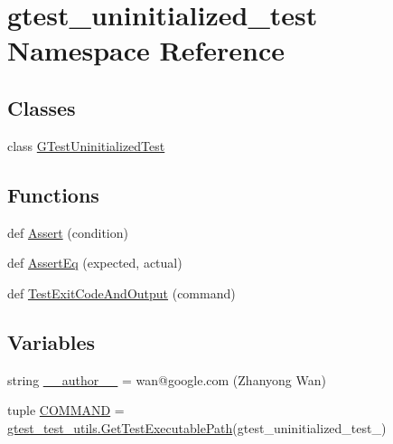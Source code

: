 \hypertarget{namespacegtest__uninitialized__test}{}\section{gtest\+\_\+uninitialized\+\_\+test Namespace Reference}
\label{namespacegtest__uninitialized__test}
\subsection*{Classes}
\begin{DoxyCompactItemize}
\item 
class \hyperlink{classgtest__uninitialized__test_1_1_g_test_uninitialized_test}{G\+Test\+Uninitialized\+Test}
\end{DoxyCompactItemize}
\subsection*{Functions}
\begin{DoxyCompactItemize}
\item 
def \hyperlink{namespacegtest__uninitialized__test_ae91f3adf38ca21141f47ac150e4d3e19}{Assert} (condition)
\item 
def \hyperlink{namespacegtest__uninitialized__test_a11a319d03e3ed2f94b95f7166ac1423b}{Assert\+Eq} (expected, actual)
\item 
def \hyperlink{namespacegtest__uninitialized__test_acb743a321be1696fc72ffbdcac897613}{Test\+Exit\+Code\+And\+Output} (command)
\end{DoxyCompactItemize}
\subsection*{Variables}
\begin{DoxyCompactItemize}
\item 
string \hyperlink{namespacegtest__uninitialized__test_aaaf66027b4590f6f1da732c0b2716e10}{\+\_\+\+\_\+author\+\_\+\+\_\+} = \textquotesingle{}wan@google.\+com (Zhanyong Wan)\textquotesingle{}
\item 
tuple \hyperlink{namespacegtest__uninitialized__test_a6341d3bb32a80c46bcca4fe5c72adf3f}{C\+O\+M\+M\+A\+N\+D} = \hyperlink{namespacegtest__test__utils_a1bdf3cac86afa675ed37629b183048e9}{gtest\+\_\+test\+\_\+utils.\+Get\+Test\+Executable\+Path}(\textquotesingle{}gtest\+\_\+uninitialized\+\_\+test\+\_\+\textquotesingle{})
\end{DoxyCompactItemize}


